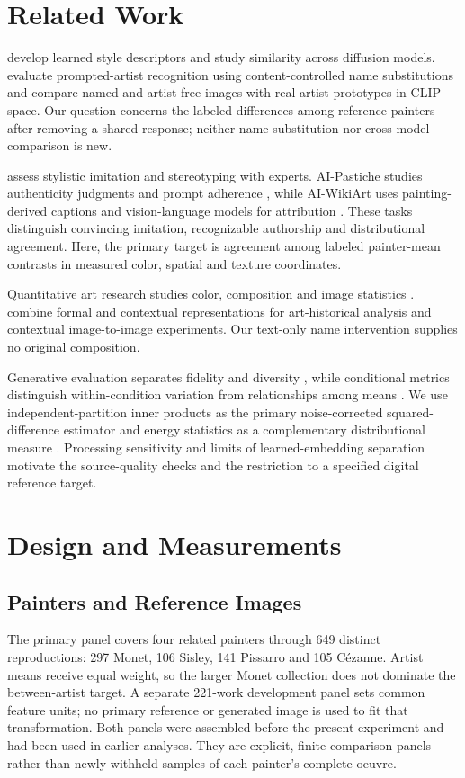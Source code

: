 \section{Related Work}
\citet{somepalli2024style} develop learned style descriptors and study similarity
across diffusion models. \citet{su2025prompted} evaluate prompted-artist
recognition using content-controlled name substitutions and compare named and
artist-free images with real-artist prototypes in CLIP space. Our question
concerns the labeled differences among reference painters after removing a
shared response; neither name substitution nor cross-model comparison is new.

\citet{deliege2025} assess stylistic imitation and stereotyping with experts.
AI-Pastiche studies authenticity judgments and prompt adherence
\citep{asperti2025pastiche}, while AI-WikiArt uses painting-derived captions and
vision-language models for attribution \citep{fu2025aiwikiart}. These tasks
distinguish convincing imitation, recognizable authorship and distributional
agreement. Here, the primary target is agreement among labeled painter-mean contrasts
in measured color, spatial and texture coordinates.

Quantitative art research studies color, composition and image statistics
\citep{kim2014,sigaki2018,lee2020}. \citet{kim2026} combine formal and contextual
representations for art-historical analysis and contextual image-to-image
experiments. Our text-only name intervention supplies no original composition.

Generative evaluation separates fidelity and diversity \citep{naeem2020},
while conditional metrics distinguish within-condition variation from relationships
among means \citep{benny2021conditional}. We use independent-partition inner products
as the primary noise-corrected squared-difference estimator \citep{diedrichsen2017representational}
and energy statistics as a complementary distributional measure \citep{szekely2013}.
Processing sensitivity \citep{parmar2022} and limits of learned-embedding
separation \citep{asperti2026} motivate the source-quality checks and the
restriction to a specified digital reference target.

\section{Design and Measurements}\label{sec:design}
\subsection{Painters and Reference Images}
The primary panel covers four related painters through 649 distinct reproductions: 297 Monet,
106 Sisley, 141 Pissarro and 105 C\'ezanne. Artist means receive equal weight,
so the larger Monet collection does not dominate the between-artist target.
A separate 221-work development panel sets common feature units; no primary
reference or generated image is used to fit that transformation. Both panels
were assembled before the present experiment and had been used in earlier
analyses. They are explicit, finite comparison panels rather than newly withheld
samples of each painter's complete oeuvre.

